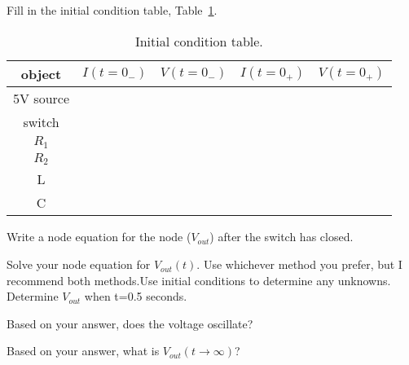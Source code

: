 \begin{clevel}
Fill in the initial condition table, Table~\ref{T:ic2}.
\end{clevel}

\par
\begin{table}[H]
\begin{center}
\begin{tabular}{|c|c|c|c|c|} \hline
object	&$I(t=0_{-})$	&$V(t=0_{-})$	&$I(t=0_{+})$	&$V(t=0_{+})$ \\ \hline
5V source&&&& \\ \hline
switch&&&& \\ \hline
$R_1$&&&& \\ \hline
$R_2$&&&& \\ \hline
L&&&& \\ \hline
C&&&& \\ \hline
\end{tabular}
\caption{Initial condition table.}
\label{T:ic2}
\end{center}
\end{table}

\begin{blevel}
Write a node equation for the node ($V_{out}$) after the switch has closed.
\end{blevel}

\begin{clevel}
Solve your node equation for $V_{out}(t)$. Use whichever method you prefer, but I recommend both methods.Use initial conditions to determine any unknowns. Determine $V_{out}$ when t=0.5 seconds.
\end{clevel}

\begin{blevel}
Based on your answer, does the voltage oscillate?
\end{blevel}

\begin{blevel}
Based on your answer, what is $V_{out}(t \rightarrow \infty)$?
\end{blevel}

